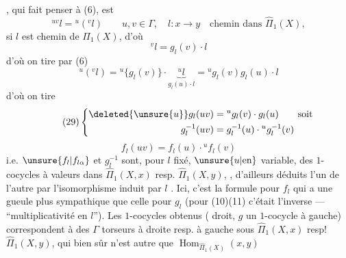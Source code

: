 , qui fait penser à (6), est
\[
\tag{28}{}^{uv}l={}^u({}^vl)
\qquad u,v\in\Gamma,\quad l:x\longrightarrow y\quad\text{chemin dans }\widehat\Pi_1(X),
\]
 si $l$ est chemin de $\Pi_1(X)$, d'où
\[
{}^vl=g_l(v)\cdot l
\]
 d'où on tire par (6)
\[
{}^u({}^vl)={}^u\{g_l(v)\}\cdot\underbrace{{}^ul}_{g_l(u)\cdot l}
={}^ug_l(v)g_l(u)\cdot l
\]
d'où on tire
\[
\tag{29}\left\{\begin{aligned}
\deleted{\unsure{u}}g_l(uv)&={}^ug_l(v)\cdot g_l(u)\qquad\text{soit}\\
g_l^{-1}(uv)&=g_l^{-1}(u)\cdot{}^ug_l^{-1}(v)
\end{aligned}\right.
\]
\[
\tag{30}f_l(uv)=f_l(u)\cdot{}^uf_l(v)
\]
i.e. $\unsure{f_l|f_{l\alpha}}$ et $g_l^{-1}$ sont, pour $l$ fixé, $\unsure{u|\text{en}}$ variable, des $1$-cocycles  à valeurs dans $\widehat\Pi_1(X,x)$ resp. $\widehat\Pi_1(X,y)$, , d'ailleurs déduits l'un de l'autre par l'isomorphisme
induit par $l$ . Ici, c'est la formule pour $f_l$ qui a une gueule plus sympathique que celle pour $g_l$ (pour (10)(11) c'était l'inverse ---  ``multiplicativité en $l$''). Les $1$-cocycles obtenus (  droit, $g$ un $1$-cocycle à gauche) correspondent à des $\Gamma$ torseurs à droite resp. à gauche sous $\widehat\Pi_1(X,x)$ resp! $\widehat\Pi_1(X,y)$, qui bien sûr n'est autre que $\operatorname{Hom}_{\widehat\Pi_1(X)}(x,y)$

